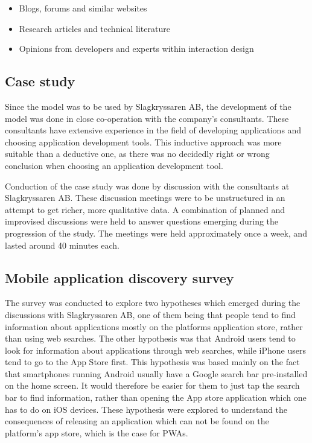 \begin{itemize}
    \item Blogs, forums and similar websites
    \item Research articles and technical literature 
    \item Opinions from developers and experts within interaction design
\end{itemize}

\subsection{Case study}

Since the model was to be used by Slagkryssaren AB, the development of the model was done in close co-operation with the company’s consultants. These consultants have extensive experience in the field of developing applications and choosing application development tools. This inductive approach was more suitable than a deductive one, as there was no decidedly right or wrong conclusion when choosing an application development tool.

Conduction of the case study was done by discussion with the consultants at Slagkryssaren AB. These discussion meetings were to be unstructured in an attempt to get richer, more qualitative data. A combination of planned and improvised discussions were held to answer questions emerging during the progression of the study. The meetings were held approximately once a week, and lasted around 40 minutes each.

\subsection{Mobile application discovery survey}

The survey was conducted to explore two hypotheses which emerged during the discussions with Slagkryssaren AB, one of them being that people tend to find information about applications mostly on the platforms application store, rather than using web searches. The other hypothesis was that Android users tend to look for information about applications through web searches, while iPhone users tend to go to the App Store first. This hypothesis was based mainly on the fact that smartphones running Android usually have a Google search bar pre-installed on the home screen. It would therefore be easier for them to just tap the search bar to find information, rather than opening the App store application which one has to do on iOS devices. These hypothesis were explored to understand the consequences of releasing an application which can not be found on the platform’s app store, which is the case for PWAs. 

